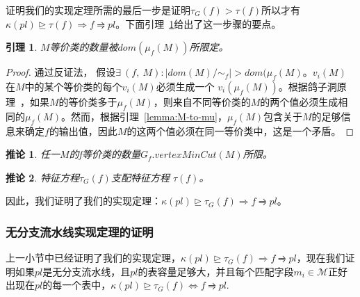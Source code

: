 \documentclass{ctexart}
\newtheorem{lemma}{引理}
\newtheorem{proof}{证明}
\newtheorem{corrollary}{推论}
\begin{document}
证明我们的实现定理所需的最后一步是证明$\tau_G(f) > \tau(f)$所以才有$\kappa(pl)\trianglerighteq \tau(f) \Rightarrow f \rightrightharpoons pl$。下面引理~\ref{lemma:domM-domMu}给出了这一步骤的要点。
 
\begin{lemma} $M$等价类的数量被$dom(\mu_f(M))$所限定。
\label{lemma:domM-domMu}
\end{lemma}

\begin{proof}
通过反证法， 假设$\exists\ (f,\ M) : |dom(M)/\sim_f| > dom(\mu_f(M)$。$v_i(M)$ 在$M$中的某个等价类的每个$v_i(M)$必须生成一个 $v_i(\mu_f(M))$。根据鸽子洞原理~\cite{ajtai1988complexity}，如果$M$的等价类多于$\mu_f(M)$，则来自不同等价类的$M$的两个值必须生成相同的$\mu_f(M)$。然而，根据引理~\ref{lemma:M-to-mu}，$\mu_f(M)$包含关于$M$的足够信息来确定$f$的输出值，因此$M$的这两个值必须在同一等价类中，这是一个矛盾。
\end{proof}


\begin{corrollary} 任一$M$的f等价类的数量$G_f.vertexMinCut(M)$所限。
\label{lemma:eq-cl-approx}
\end{corrollary}

\begin{corrollary} 特征方程$\tau_G(f)$支配特征方程 $\tau(f)$。
\label{lemma:eq-cl-approx}
\end{corrollary}



因此，我们证明了我们的实现定理：$\kappa(pl)\trianglerighteq \tau_G(f) \Rightarrow f \rightrightharpoons pl$。

\subsubsection{无分支流水线实现定理的证明}

上一小节中已经证明了我们的实现定理，$\kappa(pl)\trianglerighteq \tau_G(f) \Rightarrow f \rightrightharpoons pl$，现在我们证明如果$pl$是无分支流水线，且$pl$的表容量足够大，并且每个匹配字段$m_i \in \mathcal{M}$正好出现在$pl$的每一个表中，$\kappa(pl) \trianglerighteq \tau_G(f) \Leftrightarrow f \rightrightharpoons pl$.
%
%
\end{document}
